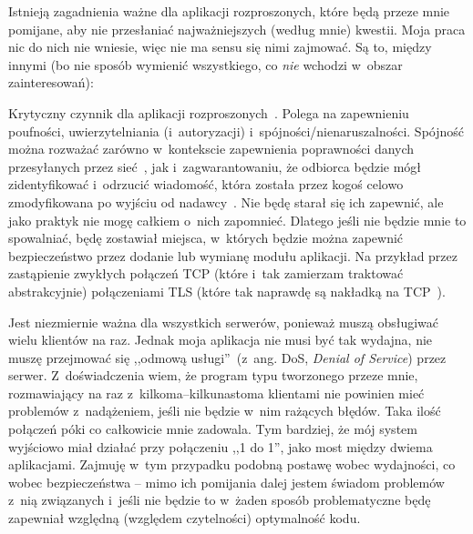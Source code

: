 \begin{description}
\end{description}

Istnieją zagadnienia ważne dla aplikacji rozproszonych, które będą przeze mnie pomijane, aby nie przesłaniać najważniejszych (według mnie) kwestii. Moja praca nic do nich nie wniesie, więc nie ma sensu się nimi zajmować. Są to, między innymi (bo nie sposób wymienić wszystkiego, co \emph{nie} wchodzi w~obszar zainteresowań):

\begin{description}
Krytyczny czynnik dla aplikacji rozproszonych~\cite[str.~21]{web-services}. Polega na zapewnieniu poufności, uwierzytelniania (i~autoryzacji) i~spójności/nienaruszalności. Spójność można rozważać zarówno w~kontekscie zapewnienia poprawności danych przesyłanych przez sieć~\cite{data-integrity}, jak i~zagwarantowaniu, że odbiorca będzie mógł zidentyfikować i~odrzucić wiadomość, która została przez kogoś celowo zmodyfikowana po wyjściu od nadawcy~\cite{data-signature}. Nie będę starał się ich zapewnić, ale jako praktyk nie mogę całkiem o~nich zapomnieć. Dlatego jeśli nie będzie mnie to spowalniać, będę zostawiał miejsca, w~których będzie można zapewnić bezpieczeństwo przez dodanie lub wymianę modułu aplikacji. Na przykład przez zastąpienie zwykłych połączeń TCP (które i~tak zamierzam traktować abstrakcyjnie) połączeniami TLS (które tak naprawdę są nakładką na TCP~\cite[str.~47]{tls}).

Jest niezmiernie ważna dla wszystkich serwerów, ponieważ muszą obsługiwać wielu klientów na raz. Jednak moja aplikacja nie musi być tak wydajna, nie muszę przejmować się ,,odmową usługi''~\cite{dos}(z~ang. DoS, \emph{Denial of Service}) przez serwer. Z~doświadczenia wiem, że program typu tworzonego przeze mnie, rozmawiający na raz z~kilkoma--kilkunastoma klientami nie powinien mieć problemów z~nadążeniem, jeśli nie będzie w~nim rażących błędów. Taka ilość połączeń póki co całkowicie mnie zadowala. Tym bardziej, że mój system wyjściowo miał działać przy połączeniu ,,1 do 1'', jako most między dwiema aplikacjami. Zajmuję w~tym przypadku podobną postawę wobec wydajności, co wobec bezpieczeństwa -- mimo ich pomijania dalej jestem świadom problemów z~nią związanych i~jeśli nie będzie to w~żaden sposób problematyczne będę zapewniał względną (względem czytelności) optymalność kodu.
\end{description}

